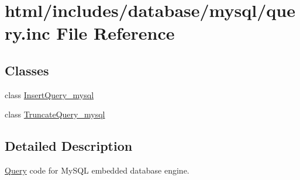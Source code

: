 \hypertarget{mysql_2query_8inc}{
\section{html/includes/database/mysql/query.inc File Reference}
\label{mysql_2query_8inc}
}
\subsection*{Classes}
\begin{DoxyCompactItemize}
\item 
class \hyperlink{classInsertQuery__mysql}{InsertQuery\_\-mysql}
\item 
class \hyperlink{classTruncateQuery__mysql}{TruncateQuery\_\-mysql}
\end{DoxyCompactItemize}


\subsection{Detailed Description}
\hyperlink{classQuery}{Query} code for MySQL embedded database engine. 